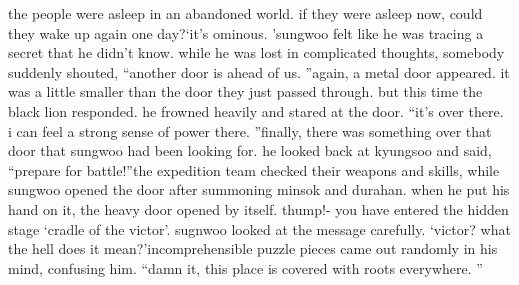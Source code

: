 the people were asleep in an abandoned world.
 if they were asleep now, could they wake up again one day?‘it’s ominous.
’sungwoo felt like he was tracing a secret that he didn’t know.
 while he was lost in complicated thoughts, somebody suddenly shouted, “another door is ahead of us.
”again, a metal door appeared.
 it was a little smaller than the door they just passed through.
but this time the black lion responded.
 he frowned heavily and stared at the door.
“it’s over there.
 i can feel a strong sense of power there.
”finally, there was something over that door that sungwoo had been looking for.
he looked back at kyungsoo and said, “prepare for battle!”the expedition team checked their weapons and skills, while sungwoo opened the door after summoning minsok and durahan.
when he put his hand on it, the heavy door opened by itself.
thump!- you have entered the hidden stage ‘cradle of the victor’.
sugnwoo looked at the message carefully.
‘victor? what the hell does it mean?’incomprehensible puzzle pieces came out randomly in his mind, confusing him.
“damn it, this place is covered with roots everywhere.
”

 